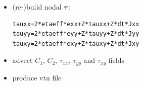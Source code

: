 \begin{itemize}
\item (re-)build nodal ${\bm \tau}$: 
\begin{lstlisting}
tauxx=2*etaeff*exx+Z*tauxx+Z*dt*Jxx
tauyy=2*etaeff*eyy+Z*tauyy+Z*dt*Jyy
tauxy=2*etaeff*exy+Z*tauxy+Z*dt*Jxy
\end{lstlisting}

\item advect $C_1$, $C_2$, $\tau_{xx}$, $\tau_{yy}$ and $\tau_{xy}$ fields

\item produce vtu file

\end{itemize}




